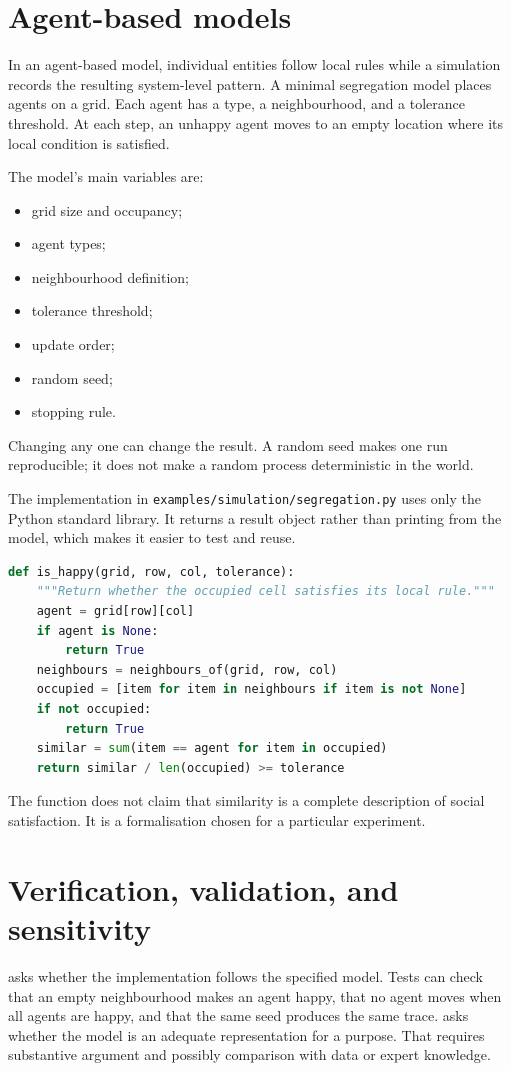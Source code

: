 \section{Agent-based models}
In an agent-based model, individual entities follow local rules while a simulation records the resulting system-level pattern. A minimal segregation model places agents on a grid. Each agent has a type, a neighbourhood, and a tolerance threshold. At each step, an unhappy agent moves to an empty location where its local condition is satisfied.

The model's main variables are:
\begin{itemize}
\item grid size and occupancy;
\item agent types;
\item neighbourhood definition;
\item tolerance threshold;
\item update order;
\item random seed;
\item stopping rule.
\end{itemize}

Changing any one can change the result. A random seed makes one run reproducible; it does not make a random process deterministic in the world.

The implementation in \texttt{examples/simulation/segregation.py} uses only the Python standard library. It returns a result object rather than printing from the model, which makes it easier to test and reuse.

\begin{lstlisting}[language=Python,caption={A small transition rule from the simulation.}]
def is_happy(grid, row, col, tolerance):
    """Return whether the occupied cell satisfies its local rule."""
    agent = grid[row][col]
    if agent is None:
        return True
    neighbours = neighbours_of(grid, row, col)
    occupied = [item for item in neighbours if item is not None]
    if not occupied:
        return True
    similar = sum(item == agent for item in occupied)
    return similar / len(occupied) >= tolerance
\end{lstlisting}

The function does not claim that similarity is a complete description of social satisfaction. It is a formalisation chosen for a particular experiment.

\section{Verification, validation, and sensitivity}
 asks whether the implementation follows the specified model. Tests can check that an empty neighbourhood makes an agent happy, that no agent moves when all agents are happy, and that the same seed produces the same trace.  asks whether the model is an adequate representation for a purpose. That requires substantive argument and possibly comparison with data or expert knowledge.

